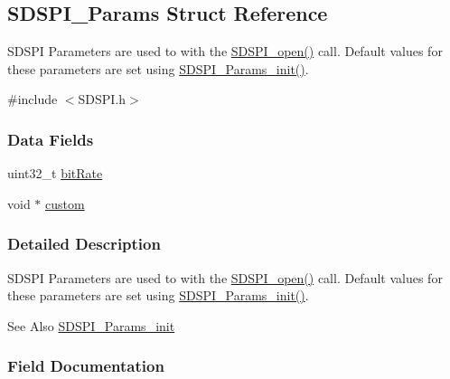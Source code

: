 \subsection{S\-D\-S\-P\-I\-\_\-\-Params Struct Reference}
\label{struct_s_d_s_p_i___params}


S\-D\-S\-P\-I Parameters are used to with the \hyperlink{_s_d_s_p_i_8h_af4a5ca9bb35e8a7df02acf20ceeae66d}{S\-D\-S\-P\-I\-\_\-open()} call. Default values for these parameters are set using \hyperlink{_s_d_s_p_i_8h_a6fe24eaba1cca88242c5df360a074ca8}{S\-D\-S\-P\-I\-\_\-\-Params\-\_\-init()}.  




{\ttfamily \#include $<$S\-D\-S\-P\-I.\-h$>$}

\subsubsection*{Data Fields}
\begin{DoxyCompactItemize}
\item 
uint32\-\_\-t \hyperlink{struct_s_d_s_p_i___params_ad1885e9d1f89f0d756198454a9cefccb}{bit\-Rate}
\item 
void $\ast$ \hyperlink{struct_s_d_s_p_i___params_ae5376d1a99dd29d9213c94b46df69ea8}{custom}
\end{DoxyCompactItemize}


\subsubsection{Detailed Description}
S\-D\-S\-P\-I Parameters are used to with the \hyperlink{_s_d_s_p_i_8h_af4a5ca9bb35e8a7df02acf20ceeae66d}{S\-D\-S\-P\-I\-\_\-open()} call. Default values for these parameters are set using \hyperlink{_s_d_s_p_i_8h_a6fe24eaba1cca88242c5df360a074ca8}{S\-D\-S\-P\-I\-\_\-\-Params\-\_\-init()}. 

\begin{DoxySeeAlso}{See Also}
\hyperlink{_s_d_s_p_i_8h_a6fe24eaba1cca88242c5df360a074ca8}{S\-D\-S\-P\-I\-\_\-\-Params\-\_\-init} 
\end{DoxySeeAlso}


\subsubsection{Field Documentation}
